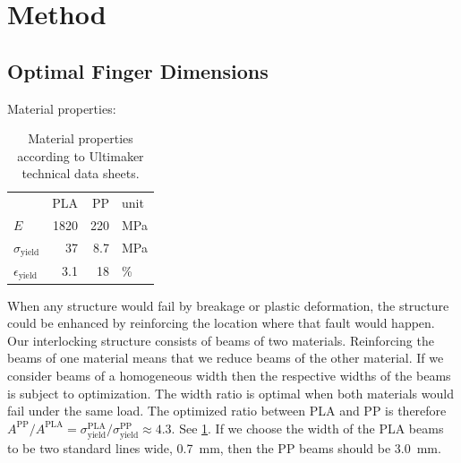 

\section{Method}


\newpage

\subsection{Optimal Finger Dimensions}
Material properties:
\begin{table}[h!]
\centering
		\caption{Material properties according to Ultimaker technical data sheets.}
		\label{tab:mat_props}
	\begin{tabular}{lrrl}
		& PLA & PP & unit \\
		$E$ & {1820} &  {220} & \si{\mega\pascal} \\
		$\sigma_\text{yield}$ & {37}& {8.7} & \si{\mega\pascal} \\
		$\epsilon_\text{yield}$ & {3.1}& {18} & \si{\percent} \\
	\end{tabular}
\end{table}


When any structure would fail by breakage or plastic deformation,
the structure could be enhanced by reinforcing the location where that fault would happen.
Our interlocking structure consists of beams of two materials.
Reinforcing the beams of one material means that we reduce beams of the other material.
If we consider beams of a homogeneous width then the respective widths of the beams is subject to optimization.
The width ratio is optimal when both materials would fail under the same load.
The optimized ratio between PLA and PP is therefore
$
A^\text{PP} / A^\text{PLA} = \sigma^\text{PLA}_\text{yield} / \sigma^\text{PP}_\text{yield}  \approx 4.3
$.
See \cref{tab:mat_props}.
If we choose the width of the PLA beams to be two standard lines wide, \SI{0.7}{\milli\meter}, then the PP beams should be \SI{3.0}{\milli\meter}.





